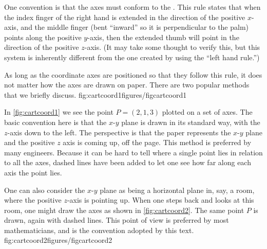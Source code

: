 One convention is that the axes must conform to the . This rule states that when the index finger of the right hand is extended in the direction of the positive $x$-axis, and the middle finger (bent ``inward'' so it is perpendicular to the palm) points along the positive $y$-axis, then the extended thumb will point in the direction of the positive $z$-axis. (It may take some thought to verify this, but this system is inherently different from the one created by using the ``left hand rule.'')

As long as the coordinate axes are positioned so that they follow this rule, it does not matter how the axes are drawn on paper. There are two popular methods that we briefly discuss.
%
{fig:cartcoord1}{figures/figcartcoord1}%


In \autoref{fig:cartcoord1} we see the point $P=(2,1,3)$ plotted on a set of axes. The basic convention here is that the $x$-$y$ plane is drawn in its standard way, with the $z$-axis down to the left. The perspective  is that the paper represents the $x$-$y$ plane and the positive $z$ axis is coming up, off the page. This method is preferred by many engineers. Because it can be hard to tell where a single point lies in relation to all the axes, dashed lines have been added to let one see how far along each axis the point lies.

One can also consider the $x$-$y$ plane as being a horizontal plane in, say, a room, where the positive $z$-axis is pointing up. When one steps back and looks at this room, one might draw the axes as shown in \autoref{fig:cartcoord2}. The same point $P$ is drawn, again with dashed lines. This point of view is preferred by most mathematicians, and is the convention adopted by this text.
%
{fig:cartcoord2}{figures/figcartcoord2}%

